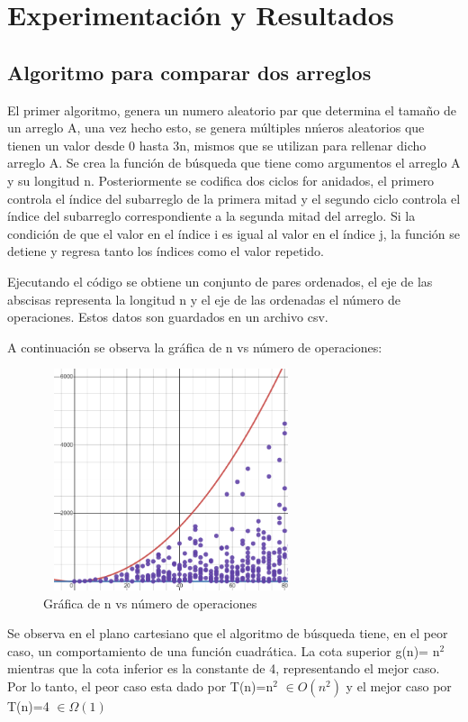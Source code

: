 \documentclass[12pt,twoside]{article}
\begin{document}
\section{Experimentaci\'on y Resultados}
    \subsection{Algoritmo para comparar dos arreglos}
    El primer algoritmo, genera un numero aleatorio par que determina el tamaño de un arreglo A, una vez hecho esto, se genera m\'ultiples n\'meros aleatorios que tienen un valor desde 0 hasta 3n, mismos que se utilizan para rellenar dicho arreglo A. 
    Se crea la funci\'on de b\'usqueda que tiene como argumentos el arreglo A y su longitud n. Posteriormente se codifica dos ciclos for anidados, el primero controla el \'indice del subarreglo de la primera mitad y el segundo ciclo controla el \'indice del subarreglo correspondiente a la segunda mitad del arreglo.
    Si la condici\'on de que el valor en el \'indice i es igual al valor en el \'indice j, la funci\'on se detiene y regresa tanto los \'indices como el valor repetido.
    
    Ejecutando el c\'odigo se obtiene un conjunto de pares ordenados, el eje de las abscisas representa la longitud n y el eje de las ordenadas el n\'umero de operaciones. Estos datos son guardados en un archivo csv.
    
    A continuación se observa la gr\'afica de n vs n\'umero de operaciones:
    
\begin{figure}[H]
    \centering
    \includegraphics[height=6.5cm , width=7.5cm]{imagenes/grafica1a.png}
    \caption{Gr\'afica de n vs n\'umero de operaciones}
\end{figure}
Se observa en el plano cartesiano que el algoritmo de b\'usqueda tiene, en el peor caso, un comportamiento de una funci\'on cuadr\'atica. La cota superior g(n)= n$^{2}$ mientras que la cota inferior es la constante de 4, representando el mejor caso. Por lo tanto, el peor caso esta dado por T(n)=n$^{2}$ $\in O(n ^2)$ y el mejor caso por T(n)=4 $\in \Omega(1)$
\end{document}
